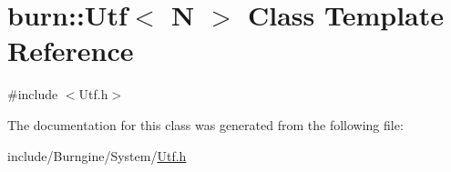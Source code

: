 \hypertarget{classburn_1_1_utf}{\section{burn\-:\-:Utf$<$ N $>$ Class Template Reference}
\label{classburn_1_1_utf}
}


{\ttfamily \#include $<$Utf.\-h$>$}



The documentation for this class was generated from the following file\-:\begin{DoxyCompactItemize}
\item 
include/\-Burngine/\-System/\hyperlink{_utf_8h}{Utf.\-h}\end{DoxyCompactItemize}
